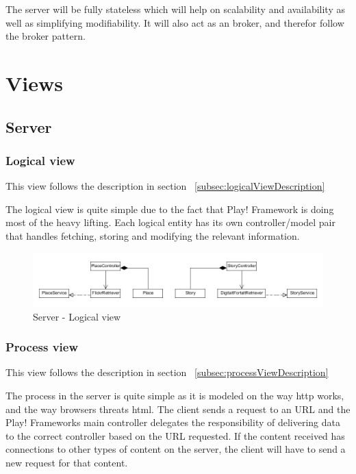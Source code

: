 \documentclass[11pt]{book}
\begin{document}
The server will be fully stateless which will help on scalability and availability as well as simplifying modifiability. It will also act as an broker, and therefor follow the broker pattern.

\section{Views}

\subsection{Server}

\subsubsection{Logical view}
This view follows the description in section ~\ref{subsec:logicalViewDescription}

The logical view is quite simple due to the fact that Play! Framework is doing most of the heavy lifting. Each logical entity has its own controller/model pair that handles fetching, storing and modifying the relevant information.

\begin{figure}[H]
      \centering
      \includegraphics[width=1.0\textwidth]{Figures/Architecture/serverLogical.jpg}
      \caption{Server - Logical view}
      \label{fig:arch_server_logical}
\end{figure}

\subsubsection{Process view}
This view follows the description in section ~\ref{subsec:processViewDescription}

The process in the server is quite simple as it is modeled on the way \gls{http} works, and the way browsers threats \gls{html}. The client sends a request to an URL and the Play! Frameworks main controller delegates the  responsibility of delivering data to the correct controller based on the URL requested. If the content received has connections to other types of content on the server, the client will have to send a new request for that content.
\end{document}

